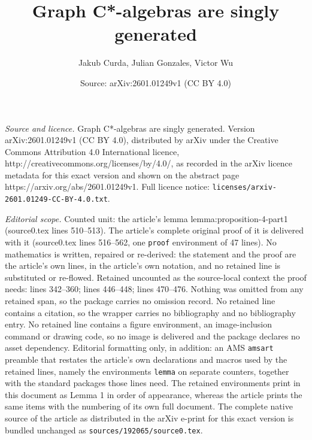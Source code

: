 \documentclass[10pt,a4paper]{amsart}
\title{Graph C*-algebras are singly generated}
\author{Jakub Curda, Julian Gonzales, Victor Wu}
\date{Source: arXiv:2601.01249v1 (CC BY 4.0)}
\begin{document}
\maketitle

\noindent\emph{Source and licence.} Graph C*-algebras are singly generated. Version arXiv:2601.01249v1 (CC BY 4.0), distributed by arXiv under the Creative Commons Attribution 4.0 International licence, http://creativecommons.org/licenses/by/4.0/, as recorded in the arXiv licence metadata for this exact version and shown on the abstract page https://arxiv.org/abs/2601.01249v1. Full licence notice: \texttt{licenses/arxiv-2601.01249-CC-BY-4.0.txt}.\par\smallskip

\noindent\textit{Editorial scope.} Counted unit: the article's lemma lemma:proposition-4-part1 (source0.tex lines 510--513). The article's complete original proof of it is delivered with it (source0.tex lines 516--562, one \texttt{proof} environment of 47 lines). No mathematics is written, repaired or re-derived: the statement and the proof are the article's own lines, in the article's own notation, and no retained line is substituted or re-flowed.  Retained uncounted as the source-local context the proof needs: lines 342--360; lines 446--448; lines 470--476.  Nothing was omitted from any retained span, so the package carries no omission record.  No retained line contains a citation, so the wrapper carries no bibliography and no bibliography entry.  No retained line contains a figure environment, an image-inclusion command or drawing code, so no image is delivered and the package declares no asset dependency.  Editorial formatting only, in addition: an AMS \texttt{amsart} preamble that restates the article's own declarations and macros used by the retained lines, namely the environments \texttt{lemma} on separate counters, together with the standard packages those lines need.  The retained environments print in this document as Lemma 1 in order of appearance, whereas the article prints the same items with the numbering of its own full document.  The complete native source of the article as distributed in the arXiv e-print for this exact version is bundled unchanged as \texttt{sources/192065/source0.tex}.
\end{document}
